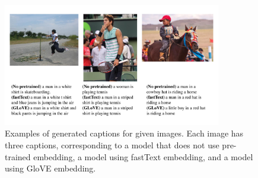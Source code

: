 \documentclass[conference]{IEEEtran}
\begin{document}
\begin{table}[h]
\centering
\caption{Performance of three models comparison in terms of BLEU-n (n = 1,2,3,4), METEOR, and ROUGE-L on the Flickr30k dataset. Bold numbers represent the best result for each metric.}
\label{tab:metric-compare-1}
\end{table}

\begin{figure}[h]
\centering
\includegraphics[width=0.85\textwidth]{assets/predict.pdf}
\caption{Examples of generated captions for given images. Each image has three captions, corresponding to a model that does not use pre-trained embedding, a model using fastText embedding, and a model using GloVE embedding.}
\label{fig:predict}
\end{figure}
\end{document}
